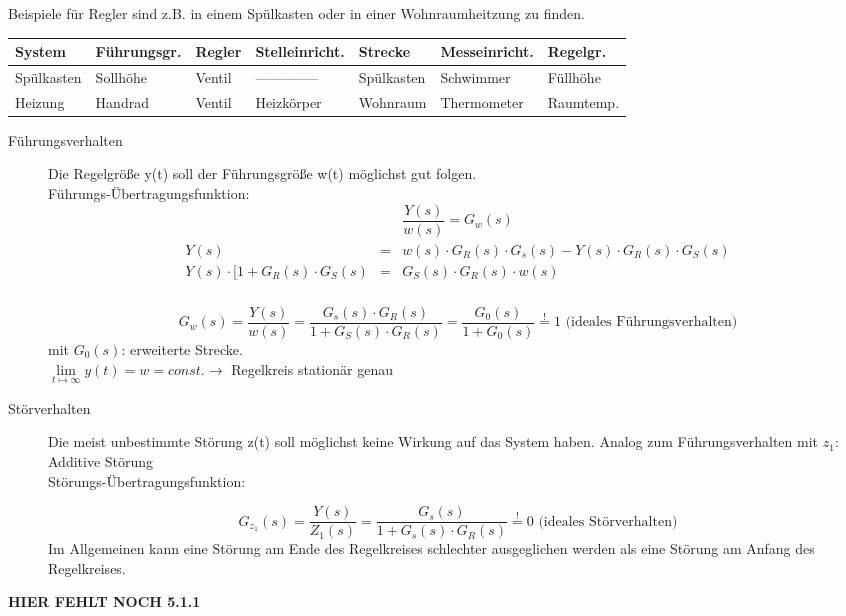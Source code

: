 \documentclass[12pt,a4paper,ngerman]{scrartcl}
\begin{document}
Beispiele für Regler sind z.B. in einem Spülkasten  oder in einer Wohnraumheitzung zu finden.
\begin{table}[H]
  \centering
  \begin{tabular}{|l||l|l|l|l|l|l|}
\hline    
 System&Führungsgr.&Regler&Stelleinricht.&Strecke&Messeinricht.&Regelgr.\\
\hline
\hline
Spülkasten&Sollhöhe&Ventil&--------------&Spülkasten&Schwimmer&Füllhöhe\\
\hline
Heizung&Handrad&Ventil&Heizkörper&Wohnraum&Thermometer&Raumtemp.\\
\hline
  \end{tabular}
\end{table}
\begin{description}
\item[Führungsverhalten] Die Regelgröße y(t) soll der Führungsgröße w(t) möglichst gut folgen. \\
Führungs-Übertragungsfunktion:
\[
\frac{Y(s)}{w(s)}=G_w(s)
\]
\begin{align*}
  \begin{array}{lll}
    Y(s)&=&w(s)\cdot G_R(s)\cdot G_s(s)-Y(s)\cdot G_R(s)\cdot G_S(s)\\
    Y(s)\cdot [1+G_R(s)\cdot G_S(s)&=&G_S(s)\cdot G_R(s)\cdot w(s)\\
  \end{array}
\end{align*}

\[G_w(s)=\frac{Y(s)}{w(s)}=\frac{G_s(s)\cdot G_R(s)}{1+G_S(s)\cdot G_R(s)}=\frac{G_0(s)}{1+G_0(s)}\stackrel{!}{=}1 \text{ (ideales Führungsverhalten)}
\]
mit $G_0(s)$: erweiterte Strecke.\\
$\lim\limits_{t\mapsto \infty}{y(t)}=w=const. \rightarrow $ Regelkreis stationär genau

\item[Störverhalten] Die meist unbestimmte Störung z(t) soll möglichst keine Wirkung auf das System haben. Analog zum Führungsverhalten mit $z_1$: Additive Störung\\
Störungs-Übertragungsfunktion:

\[
G_{z_1}(s)=\frac{Y(s)}{Z_1(s)}=\frac{G_s(s)}{1+G_s(s)\cdot G_R(s)}\stackrel{!}{=}0 \text{ (ideales Störverhalten)}
\]
Im Allgemeinen kann eine Störung am Ende des Regelkreises schlechter ausgeglichen werden als eine Störung am Anfang des Regelkreises.
\end{description}

\textbf{HIER FEHLT NOCH 5.1.1}
\end{document}
